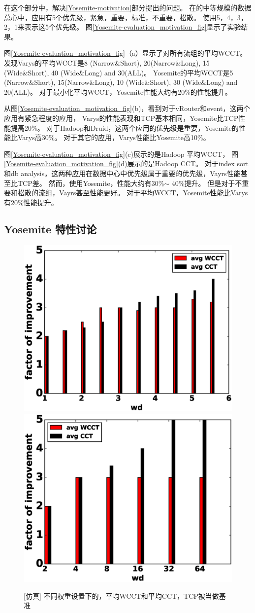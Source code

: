 在这个部分中，解决\ref{Yosemite-motivation}部分提出的问题。
在的中等规模的数据总心中，应用有5个优先级，紧急，重要，标准，不重要，松散。
使用5，4，3，2，1来表示这5个优先级。
图\ref{Yosemite-evaluation_motivation_fig}显示了实验结果。





图\ref{Yosemite-evaluation_motivation_fig}（a）显示了对所有流组的平均WCCT。
发现Varys的平均WCCT是8 (Narrow\&Short), 20(Narrow\&Long), 15 (Wide\&Short), 40  (Wide\&Long) and 30(ALL)。
Yosemite的平均WCCT是5 (Narrow\&Short), 15(Narrow\&Long), 10 (Wide\&Short), 30  (Wide\&Long) and 20(ALL)。
对于最小化平均WCCT，Yosemite性能大约有20$\%$的性能提升。

从图\ref{Yosemite-evaluation_motivation_fig}(b)，看到对于vRouter和event，这两个应用有紧急程度的应用，
Varys的性能表现和TCP基本相同，Yosemite比TCP性能提高20$\%$。
对于Hadoop和Druid，这两个应用的优先级是重要，Yosemite的性能比Varys高30$\%$。
对于其它的应用，Varys性能比Yosemite高10$\%$。

图\ref{Yosemite-evaluation_motivation_fig}(c)展示的是Hadoop 平均WCCT，
图\ref{Yosemite-evaluation_motivation_fig}(d)展示的是Hadoop CCT。
对于index sort和db analysis，这两种应用在数据中心中优先级属于重要的优先级，Vayrs性能甚至比TCP差。
然而，使用Yosemite，性能大约有30\%$\sim$ 40\%提升。
但是对于不重要和松散的流组，Vayrs甚至性能更好。
对于平均WCCT，Yosemite性能比Varys有20\%性能提升。

\subsection{Yosemite 特性讨论}

\begin{figure}[h]
\centering
{}
 {\includegraphics[width=0.48\columnwidth]{figures/Yosemite/figs/evaluation/ex3/fake7.eps}}
{\includegraphics[width=0.48\columnwidth]{figures/Yosemite/figs/evaluation/ex3/fake8.eps}}
\caption{[仿真] 不同权重设置下的，平均WCCT和平均CCT，TCP被当做基准}
\label{Yosemite-evaluation_weight_fig}
\end{figure}

